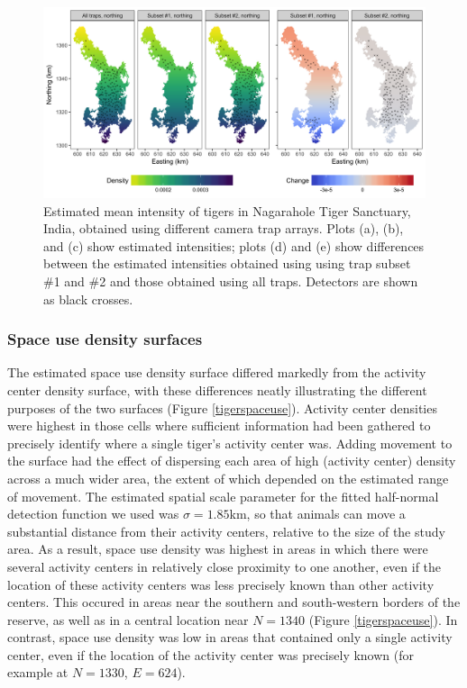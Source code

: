 \documentclass[a4paper,12pt]{article}
\begin{document}
\begin{figure}[htbp]
\centering
\includegraphics[width=1\textwidth]{tiger_surfaces_covs.png}
\caption{Estimated mean intensity of tigers in Nagarahole Tiger Sanctuary, India, obtained using different camera trap arrays. Plots (a), (b), and (c) show estimated intensities; plots (d) and (e) show differences between the estimated intensities obtained using using trap subset \#1 and \#2 and those obtained using all traps. Detectors are shown as black crosses.}
\label{tigercov}
\end{figure}

\subsubsection{Space use density surfaces}

The estimated space use density surface differed markedly from the activity center density surface, with these differences neatly illustrating the different purposes of the two surfaces (Figure \ref{tigerspaceuse}). Activity center densities were highest in those cells where sufficient information had been gathered to precisely identify where a single tiger's activity center was. Adding movement to the surface had the effect of dispersing each area of high (activity center) density across a much wider area, the extent of which depended on the estimated range of movement. The estimated spatial scale parameter for the fitted half-normal detection function we used was $\sigma=1.85$km, so that animals can move a substantial distance from their activity centers, relative to the size of the study area. As a result, space use density was highest in areas in which there were several activity centers in relatively close proximity to one another, even if the location of these activity centers was less precisely known than other activity centers. This occured in areas near the southern and south-western borders of the reserve, as well as in a central location near $N=1340$ (Figure \ref{tigerspaceuse}). In contrast, space use density was low in areas that contained only a single activity center, even if the location of the activity center was precisely known (for example at $N=1330$, $E=624$).
\end{document}
